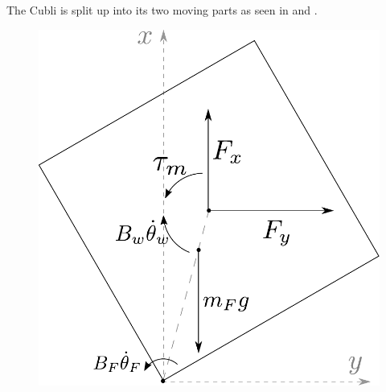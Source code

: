 

The Cubli is split up into its two moving parts as seen in  and .

  \begin{minipage}{\linewidth}
  	\begin{minipage}{0.45\linewidth}
  		\begin{figure}[H]
  			\includegraphics[scale=.5]{figures/freeBodyFrame}
  			\centering
  			\captionsetup{justification=centering}
  			\label{freeBodyFrame}
  		\end{figure}\vspace{-5mm}
  	\end{minipage}
  	\hspace{0.03\linewidth}

\end{minipage}
